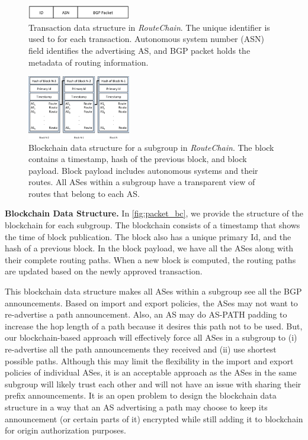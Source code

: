 \documentclass[5p]{elsarticle}
\newcommand{\BfPara}[1]{{\noindent\bf#1.}\xspace}
\newcommand{\rc}{{{\em RouteChain}}\xspace}
\begin{document}
\begin{figure}[t]
\begin{center}
\includegraphics[width=0.40\textwidth]{fig/packet.pdf}
\caption{Transaction data structure in \rc. The unique identifier is used to for each transaction. Autonomous system number (ASN) field identifies the advertising AS, and BGP packet holds the metadata of routing information. } 
\label{fig:packet}
\end{center}
\end{figure}

\begin{figure}[t]
\begin{center}
\includegraphics[width=0.40\textwidth]{fig/blockchain.pdf}
\caption{Blockchain data structure for a subgroup in \rc. The block contains a timestamp, hash of the previous block, and block payload. Block payload includes autonomous systems and their routes. All ASes within a subgroup have a transparent view of routes that belong to each AS. } 
\label{fig:packet_bc}
\end{center}
\end{figure}




\BfPara{Blockchain Data Structure}
In \autoref{fig:packet_bc}, we provide the structure of the blockchain for each subgroup. The blockchain consists of a timestamp that shows the time of block publication. The block also has a unique primary Id, and the hash of a previous block. In the block payload, we have all the ASes along with their complete routing paths. When a new block is computed, the routing paths are updated based on the newly approved transaction.

This blockchain data structure makes all ASes within a subgroup see all the BGP announcements. Based on import and export policies, the ASes may not want to re-advertise a path announcement. Also, an AS may do AS-PATH padding to increase the hop length of a path because it desires this path not to be used. But, our blockchain-based approach will effectively force all ASes in a subgroup to (i) re-advertise all the path announcements they received and (ii) use shortest possible paths. Although this may limit the flexibility in the import and export policies of individual ASes, it is an acceptable approach as the ASes in the same subgroup will likely trust each other and will not have an issue with sharing their prefix announcements. It is an open problem to design the blockchain data structure in a way that an AS advertising a path may choose to keep its announcement (or certain parts of it) encrypted while still adding it to blockchain for origin authorization purposes.
\end{document}
